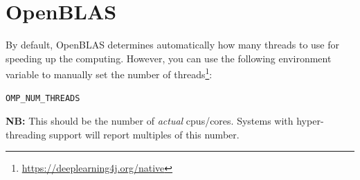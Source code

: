 \documentclass[a4paper]{book}
\begin{document}
\chapter{OpenBLAS}
By default, OpenBLAS determines automatically how many threads to use for
speeding up the computing. However, you can use the following environment
variable to manually set the number of
threads\footnote{\url{https://deeplearning4j.org/native}{}}:
\begin{verbatim}
OMP_NUM_THREADS
\end{verbatim}
\textbf{NB:} This should be the number of \textit{actual} cpus/cores.
Systems with hyper-threading support will report multiples of this number.


\end{document}
